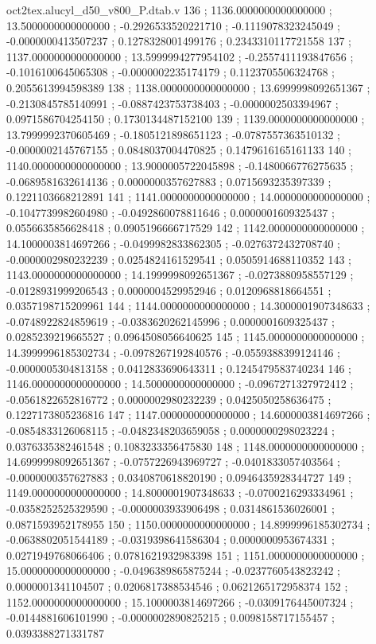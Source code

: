 \begin{filecontents}[overwrite]{oct2tex.alucyl_d50_v800_P.dtab.v}
136 ; 1136.0000000000000000 ; 13.5000000000000000 ; -0.2926533520221710 ; -0.1119078323245049 ; -0.0000000413507237 ; 0.1278328001499176 ; 0.2343310117721558
137 ; 1137.0000000000000000 ; 13.5999994277954102 ; -0.2557411193847656 ; -0.1016100645065308 ; -0.0000002235174179 ; 0.1123705506324768 ; 0.2055613994598389
138 ; 1138.0000000000000000 ; 13.6999998092651367 ; -0.2130845785140991 ; -0.0887423753738403 ; -0.0000002503394967 ; 0.0971586704254150 ; 0.1730134487152100
139 ; 1139.0000000000000000 ; 13.7999992370605469 ; -0.1805121898651123 ; -0.0787557363510132 ; -0.0000002145767155 ; 0.0848037004470825 ; 0.1479616165161133
140 ; 1140.0000000000000000 ; 13.9000005722045898 ; -0.1480066776275635 ; -0.0689581632614136 ; 0.0000000357627883 ; 0.0715693235397339 ; 0.1221103668212891
141 ; 1141.0000000000000000 ; 14.0000000000000000 ; -0.1047739982604980 ; -0.0492860078811646 ; 0.0000001609325437 ; 0.0556635856628418 ; 0.0905196666717529
142 ; 1142.0000000000000000 ; 14.1000003814697266 ; -0.0499982833862305 ; -0.0276372432708740 ; -0.0000002980232239 ; 0.0254824161529541 ; 0.0505914688110352
143 ; 1143.0000000000000000 ; 14.1999998092651367 ; -0.0273880958557129 ; -0.0128931999206543 ; 0.0000004529952946 ; 0.0120968818664551 ; 0.0357198715209961
144 ; 1144.0000000000000000 ; 14.3000001907348633 ; -0.0748922824859619 ; -0.0383620262145996 ; 0.0000001609325437 ; 0.0285239219665527 ; 0.0964508056640625
145 ; 1145.0000000000000000 ; 14.3999996185302734 ; -0.0978267192840576 ; -0.0559388399124146 ; -0.0000005304813158 ; 0.0412833690643311 ; 0.1245479583740234
146 ; 1146.0000000000000000 ; 14.5000000000000000 ; -0.0967271327972412 ; -0.0561822652816772 ; 0.0000002980232239 ; 0.0425050258636475 ; 0.1227173805236816
147 ; 1147.0000000000000000 ; 14.6000003814697266 ; -0.0854833126068115 ; -0.0482348203659058 ; 0.0000000298023224 ; 0.0376335382461548 ; 0.1083233356475830
148 ; 1148.0000000000000000 ; 14.6999998092651367 ; -0.0757226943969727 ; -0.0401833057403564 ; -0.0000000357627883 ; 0.0340870618820190 ; 0.0946435928344727
149 ; 1149.0000000000000000 ; 14.8000001907348633 ; -0.0700216293334961 ; -0.0358252525329590 ; -0.0000003933906498 ; 0.0314861536026001 ; 0.0871593952178955
150 ; 1150.0000000000000000 ; 14.8999996185302734 ; -0.0638802051544189 ; -0.0319398641586304 ; 0.0000000953674331 ; 0.0271949768066406 ; 0.0781621932983398
151 ; 1151.0000000000000000 ; 15.0000000000000000 ; -0.0496389865875244 ; -0.0237760543823242 ; 0.0000001341104507 ; 0.0206817388534546 ; 0.0621265172958374
152 ; 1152.0000000000000000 ; 15.1000003814697266 ; -0.0309176445007324 ; -0.0144881606101990 ; -0.0000002890825215 ; 0.0098158717155457 ; 0.0393388271331787

\end{filecontents}

